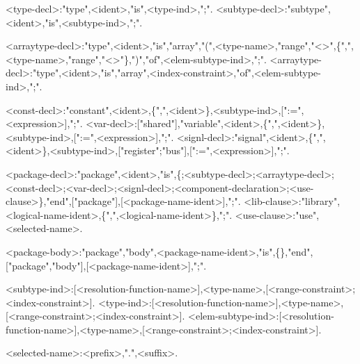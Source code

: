 <type-decl>:"type",<ident>,"is",<type-ind>,";".
<subtype-decl>:"subtype",<ident>,"is",<subtype-ind>,";".

<arraytype-decl>:"type",<ident>,"is","array","(",<type-name>,"range","\textless\textgreater",\{",",<type-name>,"range","\textless\textgreater"\},")","of",<elem-subtype-ind>,";".
<arraytype-decl>:"type",<ident>,"is","array",<index-constraint>,"of",<elem-subtype-ind>,";".

<const-decl>:"constant",<ident>,\{",",<ident>\},<subtype-ind>,[":=",<expression>],";".
<var-decl>:["shared"],"variable",<ident>,\{",",<ident>\},<subtype-ind>,[":=",<expression>],";".
<signl-decl>:"signal",<ident>,\{",",<ident>\},<subtype-ind>,["register";"bus"],[":=",<expression>],";".

<package-decl>:"package",<ident>,"is",\{<type-decl>;<subtype-decl>;<arraytype-decl>;<const-decl>;<var-decl>;<signl-decl>;<component-declaration>;<use-clause>\},"end",["package"],[<package-name-ident>],";".
<lib-clause>:"library",<logical-name-ident>,\{",",<logical-name-ident>\},";".
<use-clause>:"use",<selected-name>.

<package-body>:"package","body",<package-name-ident>,"is",\{\},"end",["package","body"],[<package-name-ident>],";".

<subtype-ind>:[<resolution-function-name>],<type-name>,[<range-constraint>;<index-constraint>].
<type-ind>:[<resolution-function-name>],<type-name>,[<range-constraint>;<index-constraint>].
<elem-subtype-ind>:[<resolution-function-name>],<type-name>,[<range-constraint>;<index-constraint>].

<selected-name>:<prefix>,".",<suffix>.

